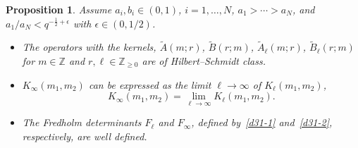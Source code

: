 \documentclass[11pt]{article}
\numberwithin{equation}{section}
\numberwithin{equation}{section}
\newtheorem{Proposition}[Theorem]{Proposition}
 { \theoremstyle{definition}
\newtheorem{Definition}[Theorem]{Definition}
\newtheorem{Note}[Theorem]{Note}
\newtheorem{Example}[Theorem]{Example}
\newtheorem{Remark}[Theorem]{Remark} }
\def\e{\epsilon}
\def\i{\infty}
\def\Z{\mathbb{Z}}
\begin{document}
\begin{Proposition}\label{p33}
Assume $a_i,b_i\in(0,1)$, $i=1,\dots,N$, $a_1>\cdots>a_N$, and $a_{1}/a_{N}<q^{-\frac12+\e}$ with $\e\in(0,1/2)$.
\begin{itemize}\itemsep=0pt
 \item[{\rm (i)}]
The operators with
the kernels, $\tilde{A}(m;r)$, $\tilde{B}(r;m)$,
$\tilde{A}_\ell(m;r)$, $\tilde{B}_\ell(r;m)$
for $m\in\Z$ and $r,\ell\in\Z_{\ge 0}$
are of Hilbert--Schmidt class.
 \item[{\rm (ii)}] $K_{\i}(m_1,m_2)$
 can be expressed as the limit $\ell\rightarrow\i$ of $K_{\ell}(m_1,m_2)$,
 \begin{equation}
 \label{p33-1}
 K_{\i}(m_1,m_2)=\lim_{\ell\rightarrow\i}K_\ell(m_1,m_2).
 \end{equation}
 \item[{\rm (iii)}]
 The Fredholm determinants $F_\ell $ and $F_{\infty}$, defined by~\eqref{d31-1} and~\eqref{d31-2}, respectively, are well defined.
\end{itemize}
\end{Proposition}
\end{document}
